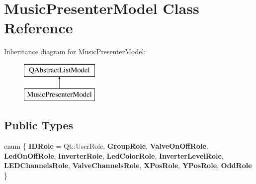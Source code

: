 \hypertarget{class_music_presenter_model}{}\section{Music\+Presenter\+Model Class Reference}
\label{class_music_presenter_model}
Inheritance diagram for Music\+Presenter\+Model\+:\begin{figure}[H]
\begin{center}
\leavevmode
\includegraphics[height=2.000000cm]{class_music_presenter_model}
\end{center}
\end{figure}
\subsection*{Public Types}
\begin{DoxyCompactItemize}
\item 
\mbox{\label{class_music_presenter_model_aad086f8b0c5f5a152198fe378eb9d07d}} 
enum \{ \newline
{\bfseries I\+D\+Role} = Qt\+:\+:User\+Role, 
{\bfseries Group\+Role}, 
{\bfseries Valve\+On\+Off\+Role}, 
{\bfseries Led\+On\+Off\+Role}, 
\newline
{\bfseries Inverter\+Role}, 
{\bfseries Led\+Color\+Role}, 
{\bfseries Inverter\+Level\+Role}, 
{\bfseries L\+E\+D\+Channels\+Role}, 
\newline
{\bfseries Valve\+Channels\+Role}, 
{\bfseries X\+Pos\+Role}, 
{\bfseries Y\+Pos\+Role}, 
{\bfseries Odd\+Role}
 \}
\end{DoxyCompactItemize}
